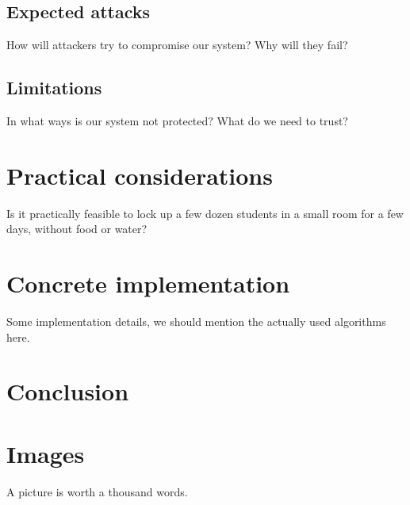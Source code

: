 \documentclass{article}
\begin{document}
\subsection{Expected attacks}

How will attackers try to compromise our system? Why will they fail?

\subsection{Limitations}

In what ways is our system not protected? What do we need to trust?

\section{Practical considerations}

Is it practically feasible to lock up a few dozen students in a small room for a
few days, without food or water?

\section{Concrete implementation}

Some implementation details, we should mention the actually used algorithms
here.

\section{Conclusion}

\section{Images}

A picture is worth a thousand words.
\end{document}
